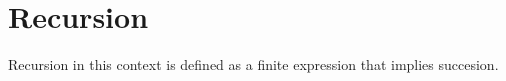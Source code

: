 \documentclass[12pt,a4paper,teal]{bbe}
\begin{document}
	\chapter[]{Recursion}
	Recursion in this context is defined as a finite expression that implies
	succesion.
	
 
\end{document}
